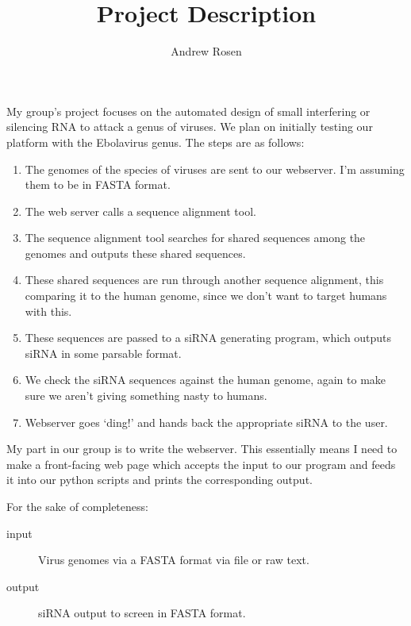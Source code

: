 \documentclass[10pt,a4paper]{article}
\author{Andrew Rosen}
\title{Project Description}
\begin{document}
\maketitle

My group's project focuses on the automated design of small interfering or silencing RNA to attack a genus of viruses. 
We plan on initially testing our platform with the Ebolavirus genus.
The steps are as follows:

\begin{enumerate}
	\item The genomes of the species of viruses are sent to our webserver.  
	I'm assuming them to be in FASTA format.
	\item The web server calls a sequence alignment tool.
	\item The sequence alignment tool searches for shared sequences among the genomes and outputs these shared sequences.
	\item These shared sequences are run through another sequence alignment, this comparing it to the human genome, since we don't want to target humans with this. 
	\item These sequences are passed to a siRNA generating program, which outputs siRNA in some parsable format.
	\item We check the siRNA sequences against the human genome, again to make sure we aren't giving something nasty to humans.
	\item Webserver goes `ding!' and hands back the appropriate siRNA to the user.
\end{enumerate}



My part in our group is to write the webserver.
This essentially  means I need to make a front-facing web page which accepts the input to our program and feeds it into our python scripts and prints the corresponding output.

For the sake of completeness:
\begin{description}
	\item[input] Virus genomes via a FASTA format via file or raw text.
	\item[output] siRNA output to screen in FASTA format.
	
\end{description}
\end{document}
